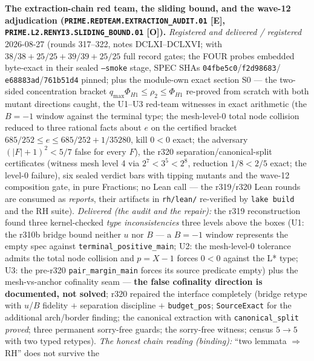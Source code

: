 \documentclass[11pt,a4paper]{article}
\begin{document}
\par\smallskip\noindent\textbf{The extraction-chain red team, the
sliding bound, and the wave-12 adjudication
(\texttt{PRIME.REDTEAM.\allowbreak EXTRACTION\_AUDIT.01} [E],
\texttt{PRIME.L2.\allowbreak RENYI3.\allowbreak SLIDING\_BOUND.01}
[O]).}
{\sloppy
\emph{Registered and delivered / registered} 2026-08-27 (rounds
317--322, notes DCLXI--DCLXVI;
 with $38/38 + 25/25 + 39/39 +
25/25$ full record gates; the FOUR probes embedded byte-exact in
their sealed \texttt{--smoke} stage, SPEC SHAs
\texttt{04fbe5c0}/\allowbreak\texttt{f2d98683}/\allowbreak
\texttt{e68883ad}/\allowbreak\texttt{761b51d4} pinned; plus the
module-own exact section S0 --- the two-sided concentration
bracket $q_{\max}\Phi_{H1} \le \rho_2 \le \Phi_{H1}$ re-proved
from scratch with both mutant directions caught, the U1--U3
red-team witnesses in exact arithmetic (the $B = -1$ window
against the terminal type; the mesh-level-0 total node collision
reduced to three rational facts about $e$ on the certified bracket
$685/252 \le e \le 685/252 + 1/35280$, kill $0 < 0$ exact; the
adversary $(|F|+1)^2 < 5/7$ false for every $F$), the r320
separation/canonical-split certificates (witness mesh level 4 via
$2^7 < 3^5 < 2^8$, reduction $1/8 < 2/5$ exact; the level-0
failure), six sealed verdict bars with tipping mutants and the
wave-12 composition gate, in pure Fractions; no Lean call --- the
r319/r320 Lean rounds are consumed as \emph{reports}, their
artifacts in \texttt{rh/lean/} re-verified by \texttt{lake build}
and the RH suite).  \emph{Delivered (the audit and the repair):}
the r319 reconstruction found three kernel-checked \emph{type
inconsistencies} three levels above the boxes (U1: the r310b
bridge bound neither $u$ nor $B$ --- a $B = -1$ window represents
the empty spec against \texttt{terminal\_positive\_main}; U2: the
mesh-level-0 tolerance admits the total node collision and
$p = X - 1$ forces $0 < 0$ against the L* type; U3: the pre-r320
\texttt{pair\_margin\_main} forces its source predicate empty)
plus the mesh-vs-anchor cofinality seam --- \textbf{the false
cofinality direction is documented, not solved}; r320 repaired the
interface completely (bridge retype with $u$/$B$ fidelity $+$
separation discipline $+$ \texttt{budget\_pos};
\texttt{SourceExact} for the additional arch/border finding; the
canonical extraction with \texttt{canonical\_split} \emph{proved};
three permanent sorry-free guards; the sorry-free witness; census
$5 \to 5$ with two typed retypes).  \emph{The honest chain reading
(binding):} ``two lemmata $\Rightarrow$ RH'' does not survive the
}
\end{document}

